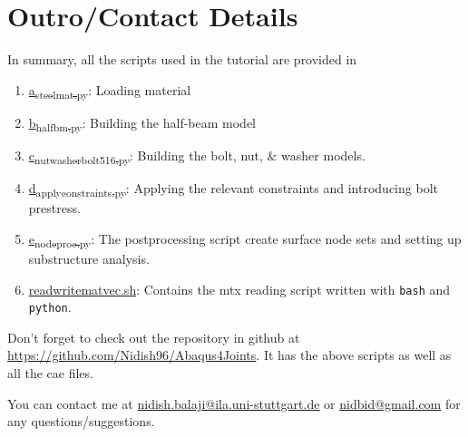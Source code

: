 \documentclass[11pt]{article}
\begin{document}
\section{Outro/Contact Details}
\label{sec:orgd9ac133}
In summary, all the scripts used in the tutorial are provided in 
\begin{enumerate}
\item \href{https://github.com/Nidish96/Abaqus4Joints/blob/main/scripts/a\_steelmat.py}{a\textsubscript{steelmat.py}}: Loading material
\item \href{https://github.com/Nidish96/Abaqus4Joints/blob/main/scripts/b\_halfbm.py}{b\textsubscript{halfbm.py}}: Building the half-beam model
\item \href{https://github.com/Nidish96/Abaqus4Joints/blob/main/scripts/c\_nutwasherbolt\_516.py}{c\textsubscript{nutwasherbolt}\textsubscript{516.py}}: Building the bolt, nut, \& washer models.
\item \href{https://github.com/Nidish96/Abaqus4Joints/blob/main/scripts/d\_applyconstraints.py}{d\textsubscript{applyconstraints.py}}: Applying the relevant constraints and introducing bolt prestress.
\item \href{https://github.com/Nidish96/Abaqus4Joints/blob/main/scripts/e\_nodeproc.py}{e\textsubscript{nodeproc.py}}: The postprocessing script create surface node sets and setting up substructure analysis.
\item \href{https://github.com/Nidish96/Abaqus4Joints/blob/main/scripts/readwritematvec.sh}{readwritematvec.sh}: Contains the mtx reading script written with \texttt{bash} and \texttt{python}.
\end{enumerate}

Don't forget to check out the repository in github at \href{https://github.com/Nidish96/Abaqus4Joints/blob/main/assets/assembly/model\_step3.cae}{https://github.com/Nidish96/Abaqus4Joints}.
It has the above scripts as well as all the cae files.

You can contact me at \href{mailto:nidish.balaji@ila.uni-stuttgart.de}{nidish.balaji@ila.uni-stuttgart.de} or \href{mailto:nidbid@gmail.com}{nidbid@gmail.com} for any questions/suggestions.
\end{document}
